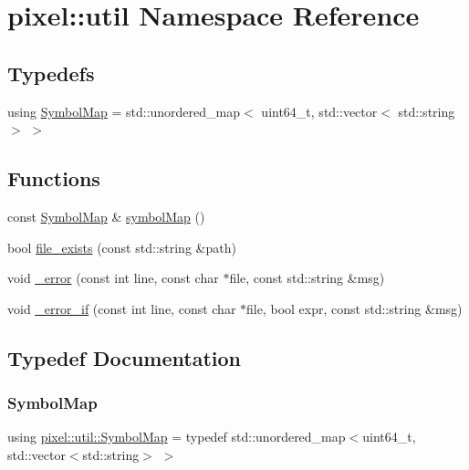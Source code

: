\hypertarget{namespacepixel_1_1util}{}\section{pixel\+:\+:util Namespace Reference}
\label{namespacepixel_1_1util}
\subsection*{Typedefs}
\begin{DoxyCompactItemize}
\item 
using \hyperlink{namespacepixel_1_1util_a7e4aecf0b9c892f3b2726c5a5cf00b02}{Symbol\+Map} = std\+::unordered\+\_\+map$<$ uint64\+\_\+t, std\+::vector$<$ std\+::string $>$ $>$
\end{DoxyCompactItemize}
\subsection*{Functions}
\begin{DoxyCompactItemize}
\item 
const \hyperlink{namespacepixel_1_1util_a7e4aecf0b9c892f3b2726c5a5cf00b02}{Symbol\+Map} \& \hyperlink{namespacepixel_1_1util_a976cdfe804320f21bc1dd56c6cf95f60}{symbol\+Map} ()
\item 
bool \hyperlink{namespacepixel_1_1util_a6e0623837ee2f07f9d9a45ad01cfb054}{file\+\_\+exists} (const std\+::string \&path)
\item 
void \hyperlink{namespacepixel_1_1util_a25ba63c542a62436db23183014cb16d4}{\+\_\+error} (const int line, const char $\ast$file, const std\+::string \&msg)
\item 
void \hyperlink{namespacepixel_1_1util_a32d24684a1bc7da7f5d746d7f40517b1}{\+\_\+error\+\_\+if} (const int line, const char $\ast$file, bool expr, const std\+::string \&msg)
\end{DoxyCompactItemize}


\subsection{Typedef Documentation}
\mbox{\label{namespacepixel_1_1util_a7e4aecf0b9c892f3b2726c5a5cf00b02}} 
\subsubsection{\texorpdfstring{Symbol\+Map}{SymbolMap}}
{\footnotesize\ttfamily using \hyperlink{namespacepixel_1_1util_a7e4aecf0b9c892f3b2726c5a5cf00b02}{pixel\+::util\+::\+Symbol\+Map} = typedef std\+::unordered\+\_\+map$<$uint64\+\_\+t, std\+::vector$<$std\+::string$>$ $>$}



